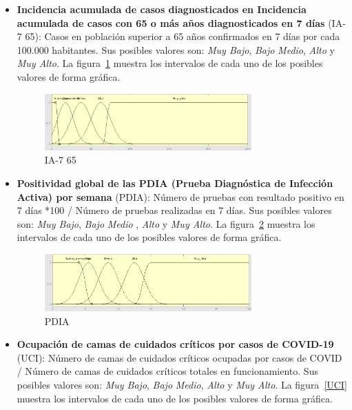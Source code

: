 \documentclass[12pt,a4paper, xcolor=table]{article}
\begin{document}
\begin{itemize}
    \item \textbf{Incidencia acumulada de casos diagnosticados en Incidencia acumulada de casos con 65 o más años diagnosticados en 7 días} (IA-7 65): Casos en población superior a 65 años confirmados en 7 días por cada 100.000 habitantes. Sus posibles valores son: \textit{Muy Bajo}, \textit{Bajo} \textit{Medio}, {\textit{Alto}} y {\textit{Muy Alto}}. La figura~\ref{IA-7 65} muestra los intervalos de cada uno de los posibles valores de forma gráfica.

    \begin{figure}[!h]
      \centering
      \includegraphics[width=300px]{img/ia_65_7.png}
      \caption{IA-7 65}
      \label{IA-7 65}
    \end{figure}

    \item \textbf{Positividad global de las PDIA (Prueba Diagnóstica de Infección Activa) por semana} (PDIA): Número de pruebas con resultado positivo en 7 días *100 / Número de pruebas realizadas en 7 días. Sus posibles valores son: \textit{Muy Bajo}, \textit{Bajo} \textit{Medio }, {\textit{Alto}} y {\textit{Muy Alto}}. La figura~\ref{PDIA} muestra los intervalos de cada uno de los posibles valores de forma gráfica.

    \begin{figure}[!h]
      \centering
      \includegraphics[width=300px]{img/PDIA.png}
      \caption{PDIA}
      \label{PDIA}
    \end{figure}

    \item \textbf{Ocupación de camas de cuidados críticos por casos de COVID-19} (UCI): Número de camas de cuidados críticos ocupadas por casos de COVID / Número de camas de cuidados críticos totales en funcionamiento. Sus posibles valores son: \textit{Muy Bajo}, \textit{Bajo} \textit{Medio}, {\textit{Alto}} y {\textit{Muy Alto}}. La figura~\ref{UCI} muestra los intervalos de cada uno de los posibles valores de forma gráfica.


\end{itemize}
\end{document}
